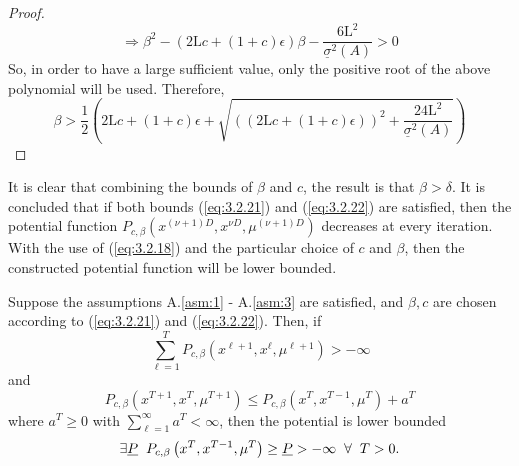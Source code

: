 \begin{proof}
\begin{equation*}
        \end{equation*}
        \begin{equation*}
           \Rightarrow \beta^2 -(2\mathrm{L}c + (1+c)\epsilon)\beta - \frac{6\mathrm{L}^2}{\underline{\sigma}^2(A)} > 0
        \end{equation*}
        So, in order to have a large sufficient value, only the positive root of the above polynomial will be used. Therefore,
        \begin{equation}\label{eq:3.2.22}
            \beta > \frac{1}{2}\left(2\mathrm{L}c + \left(1+c\right)\epsilon + \sqrt{\left(\left(2\mathrm{L}c + \left(1+c\right)\epsilon\right)\right)^2 + \frac{24\mathrm{L}^2}{\underline{\sigma}^2(A)}} \right)
        \end{equation}
    \end{proof}
    It is clear that combining the bounds of $\beta$ and $c$, the result is that $\beta > \delta$. It is concluded that if both bounds (\ref{eq:3.2.21}) and (\ref{eq:3.2.22}) are satisfied, then the potential function $P_{c,\beta}(x^{(\nu + 1)D}, x^{\nu D}, \mu^{(\nu + 1)D})$ decreases at every iteration. With the use of (\ref{eq:3.2.18}) and the particular choice of $c$ and $\beta$, then the constructed potential function will be lower bounded.
    \begin{lemma}\label{lem:3.5}
        Suppose the assumptions A.\ref{asm:1} - A.\ref{asm:3} are satisfied, and $\beta, c$ are chosen according to (\ref{eq:3.2.21}) and (\ref{eq:3.2.22}). Then, if
        \begin{equation*}
            \sum_{\ell = 1}^{T} P_{c,\beta} \left(x^{\ell + 1}, x^{\ell}, \mu^{\ell + 1}\right) > -\infty
        \end{equation*}
        and
        \begin{equation*}
            P_{c,\beta}\left(x^{T + 1}, x^{T}, \mu^{T + 1}\right) \leq P_{c, \beta} \left(x^{T}, x^{T - 1}, \mu^{T}\right) + a^T
        \end{equation*}
        where $a^T \geq 0$ with $\sum_{\ell = 1}^{\infty} a^T < \infty$, then the potential is lower bounded
        \begin{equation}\label{eq:3.2.23}
            \exists \underline{P} \hspace{2.0mm} P_{c, \beta} \left(x^{T}, x^{T - 1}, \mu^{T}\right) \geq \underline{P} > -\infty \hspace{2.0mm} \forall \hspace{2.0mm} T > 0.
        \end{equation}
    \end{lemma}

